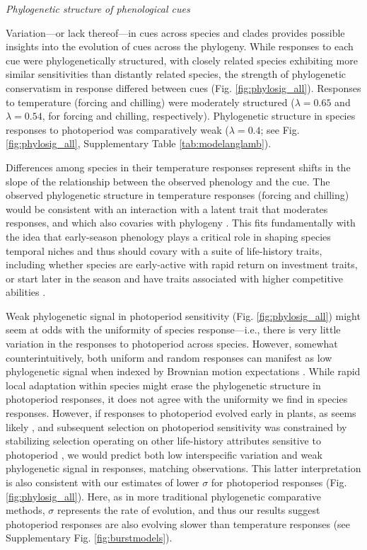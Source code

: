 \documentclass[11pt]{article}
\begin{document}
\emph{Phylogenetic structure of phenological cues}

\par Variation---or lack thereof---in cues across species and clades provides possible insights into the evolution of cues across the phylogeny. While responses to each cue were phylogenetically structured, with closely related species exhibiting more similar sensitivities than distantly related species, the strength of phylogenetic conservatism in response differed between cues (Fig. \ref{fig:phylosig_all}). Responses to temperature (forcing and chilling) were moderately structured ($\lambda = 0.65$ and $\lambda = 0.54$, for forcing and chilling, respectively). Phylogenetic structure in species responses to photoperiod was comparatively weak ($\lambda= 0.4$; see Fig. \ref{fig:phylosig_all}, Supplementary Table \ref{tab:modelanglamb}).

\par Differences among species in their temperature responses represent shifts in the slope of the relationship between the observed phenology and the cue. The observed phylogenetic structure in temperature responses (forcing and chilling) would be consistent with an interaction with a latent trait that moderates responses, and which also covaries with phylogeny \citep{davies2019phylogenetically}. This fits fundamentally with the idea that early-season phenology plays a critical role in shaping species temporal niches \citep{gotelli1996} and thus should covary with a suite of life-history traits, including whether species are early-active with rapid return on investment traits, or start later in the season and have traits associated with higher competitive abilities \citep[e.g.,][]{Grime:1977sw,memegan2021}.

\par Weak phylogenetic signal in photoperiod sensitivity (Fig. \ref{fig:phylosig_all}) might seem at odds with the uniformity of species response---i.e., there is very little variation in the responses to photoperiod across species. However, somewhat counterintuitively, both uniform and random responses can manifest as low phylogenetic signal when indexed by Brownian motion expectations \citep{wiens2010niche}. While rapid local adaptation within species might erase the phylogenetic structure in photoperiod responses, it does not agree with the uniformity we find in species responses. However, if responses to photoperiod evolved early in plants, as seems likely \citep{serrano2017}, and subsequent selection on photoperiod sensitivity was constrained by stabilizing selection operating on other life-history attributes sensitive to photoperiod \citep[e.g.,][]{Rinne:1994,Wilczek2014,azeez2015}, we would predict both low interspecific variation and weak phylogenetic signal in responses, matching observations. This latter interpretation is also consistent with our estimates of lower $\sigma$ for photoperiod responses (Fig. \ref{fig:phylosig_all}). Here, as in more traditional phylogenetic comparative methods, $\sigma$ represents the rate of evolution, and thus our results suggest photoperiod responses are also evolving slower than temperature responses (see Supplementary Fig. \ref{fig:burstmodels}).
\end{document}
